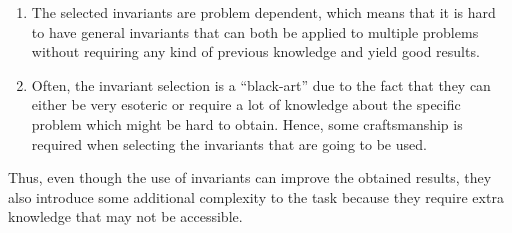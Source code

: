 \begin{enumerate}
    \item The selected invariants are problem dependent, which means that it is hard to have general invariants
    that can both be applied to multiple problems without requiring any kind of previous knowledge
    and yield good results.
    \item Often, the invariant selection is a ``black-art'' due to the fact that they can either be
    very esoteric or require a lot of knowledge about the specific problem which might be hard
    to obtain. Hence, some craftsmanship is required when selecting the invariants that are going
    to be used.
\end{enumerate}

Thus, even though the use of invariants can improve the obtained results, they also introduce some additional
complexity to the task because they require extra knowledge that may not be accessible.
